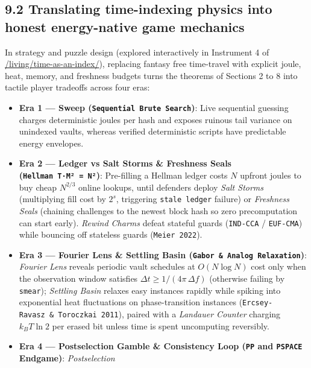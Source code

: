 \documentclass[10pt,letterpaper]{article}
\providecommand{\tightlist}{\setlength{\itemsep}{1pt}\setlength{\parskip}{0pt}}
\begin{document}
\subsection{9.2 Translating time-indexing physics into honest
energy-native game
mechanics}\label{translating-time-indexing-physics-into-honest-energy-native-game-mechanics}

In strategy and puzzle design (explored interactively in Instrument 4 of
\href{https://research.openie.dev/living/time-as-an-index/}{/living/time-as-an-index/}),
replacing fantasy free time-travel with explicit joule, heat, memory,
and freshness budgets turns the theorems of Sections 2 to 8 into tactile
player tradeoffs across four eras:

\begin{itemize}
\tightlist
\item
  \textbf{Era 1 --- Sweep (\texttt{Sequential\ Brute\ Search})}: Live
  sequential guessing charges deterministic joules per hash and exposes
  ruinous tail variance on unindexed vaults, whereas verified
  deterministic scripts have predictable energy envelopes.
\item
  \textbf{Era 2 --- Ledger vs Salt Storms \& Freshness Seals
  (\texttt{Hellman\ T·M²\ =\ N²})}: Pre-filling a Hellman ledger costs
  \(N\) upfront joules to buy cheap \(N^{2/3}\) online lookups, until
  defenders deploy \emph{Salt Storms} (multiplying fill cost by \(2^s\),
  triggering \texttt{stale\ ledger} failure) or \emph{Freshness Seals}
  (chaining challenges to the newest block hash so zero precomputation
  can start early). \emph{Rewind Charms} defeat stateful guards
  (\texttt{IND-CCA} / \texttt{EUF-CMA}) while bouncing off stateless
  guards (\texttt{Meier\ 2022}).
\item
  \textbf{Era 3 --- Fourier Lens \& Settling Basin
  (\texttt{Gabor\ \&\ Analog\ Relaxation})}: \emph{Fourier Lens} reveals
  periodic vault schedules at \(O(N \log N)\) cost only when the
  observation window satisfies \(\Delta t \ge 1/(4\pi\,\Delta f)\)
  (otherwise failing by \texttt{smear}); \emph{Settling Basin} relaxes
  easy instances rapidly while spiking into exponential heat
  fluctuations on phase-transition instances
  (\texttt{Ercsey-\allowbreak{}Ravasz\ \&\ Toroczkai\ 2011}), paired with a
  \emph{Landauer Counter} charging \(k_B T \ln 2\) per erased bit unless
  time is spent uncomputing reversibly.
\item
  \textbf{Era 4 --- Postselection Gamble \& Consistency Loop
  (\texttt{PP} and \texttt{PSPACE} Endgame)}: \emph{Postselection
}
\end{itemize}
\end{document}
